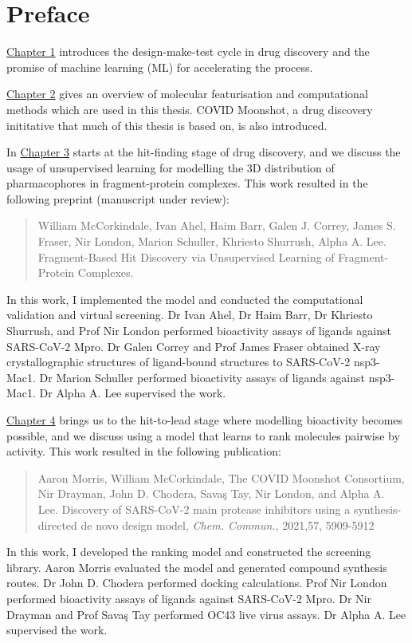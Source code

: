 \chapter*{Preface}
\hyperref[ch:intro]{Chapter 1} introduces the design-make-test cycle in drug discovery and the promise of machine learning (ML) for accelerating the process.

\hyperref[ch:background]{Chapter 2} gives an overview of molecular featurisation and computational methods which are used in this thesis. COVID Moonshot, a drug discovery inititative that much of this thesis is based on, is also introduced.

In \hyperref[ch:fresco]{Chapter 3} starts at the hit-finding stage of drug discovery, and we discuss the usage of unsupervised learning for modelling the 3D distribution of pharmacophores in fragment-protein complexes. This work resulted in the following preprint (manuscript under review):
\begin{quote}
William McCorkindale, Ivan Ahel, Haim Barr, Galen J. Correy, James S. Fraser, Nir London, Marion Schuller, Khriesto Shurrush, Alpha A. Lee. Fragment-Based Hit Discovery via Unsupervised Learning of Fragment-Protein Complexes.
\end{quote}
In this work, I implemented the model and conducted the computational validation and virtual screening. Dr Ivan Ahel, Dr Haim Barr, Dr Khriesto Shurrush, and Prof Nir London performed bioactivity assays of ligands against SARS-CoV-2 Mpro. Dr Galen Correy and Prof James Fraser obtained X-ray crystallographic structures of ligand-bound structures to SARS-CoV-2 nsp3-Mac1. Dr Marion Schuller performed bioactivity assays of ligands against nsp3-Mac1. Dr Alpha A. Lee supervised the work.

\hyperref[ch:ranking]{Chapter 4} brings us to the hit-to-lead stage where modelling bioactivity becomes possible, and we discuss using a model that learns to rank molecules pairwise by activity. This work resulted in the following publication:
\begin{quote}
Aaron Morris, William McCorkindale, The COVID Moonshot Consortium, Nir Drayman, John D. Chodera, Savaş Tay, Nir London, and Alpha A. Lee. Discovery of SARS-CoV-2 main protease inhibitors using a synthesis-directed de novo design model, \textit{Chem. Commun.}, 2021,57, 5909-5912 
\end{quote}
In this work, I developed the ranking model and constructed the screening library. Aaron Morris evaluated the model and generated compound synthesis routes. Dr John D. Chodera performed docking calculations. Prof Nir London performed bioactivity assays of ligands against SARS-CoV-2 Mpro. Dr Nir Drayman and Prof Savaş Tay performed OC43 live virus assays. Dr Alpha A. Lee supervised the work.

